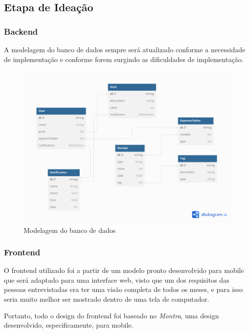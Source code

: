 \subsection{Etapa de Ideação}


\subsubsection{Backend}

A modelagem do banco de dados sempre será atualizado conforme a necessidade de implementação e conforme forem surgindo as dificuldades de implementação.

\begin{figure}[!htb]
    \centering
    \caption[short]{Modelagem do banco de dados}
    \includegraphics[scale=0.4]{images/backend_model.png}
\end{figure}


\subsubsection{Frontend}

O frontend utilizado foi a partir de um modelo pronto desenvolvido para mobile que será adaptado para uma interface web, visto que um dos requisitos das pessoas entrevistadas era ter uma visão completa de todos os meses, e para isso seria muito melhor ser mostrado dentro de uma tela de computador.

Portanto, todo o design do frontend foi baseado no \textit{Montra}, uma design desenvolvido, especificamente, para mobile.




